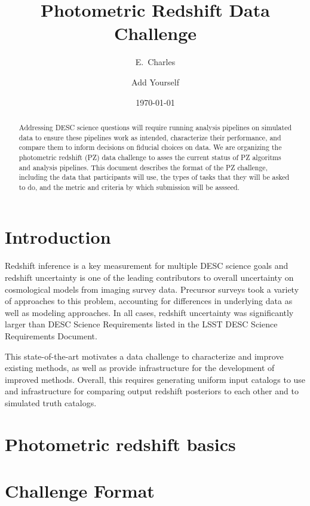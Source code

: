 \documentclass[modern]{desc-tex/styles/lsstdescnote}
\begin{document}
\title{Photometric Redshift Data Challenge}
\author{E.\ Charles}
\author{Add Yourself} 
\date{\today}

\begin{abstract}
 Addressing DESC science questions will require running analysis
 pipelines on simulated data to ensure these pipelines work as
 intended, characterize their performance, and compare them to inform
 decisions on fiducial choices on data.  We are organizing the
 photometric redshift (PZ) data challenge to asses the current status
 of PZ algoritms and analysis pipelines.   This document describes the
 format of the PZ challenge, including the data that participants will
 use, the types of tasks that they will be asked to do, and the metric
 and criteria by which submission will be assseed.
 \end{abstract}

\maketitle

\section{Introduction}

Redshift inference is a key measurement for multiple DESC science
goals and redshift uncertainty is one of the leading contributors to
overall uncertainty on cosmological models from imaging survey
data. Precursor surveys took a variety of approaches to this problem,
accounting for differences in underlying data as well as modeling
approaches. In all cases, redshift uncertainty was significantly
larger than DESC Science Requirements listed in the LSST DESC Science
Requirements Document.

This state-of-the-art motivates a data challenge to characterize and
improve existing methods, as well as provide infrastructure for the
development of improved methods. Overall, this requires generating
uniform input catalogs to use and infrastructure for comparing output
redshift posteriors to each other and to simulated truth catalogs.

\section{Photometric redshift basics}



\section{Challenge Format}
\end{document}

